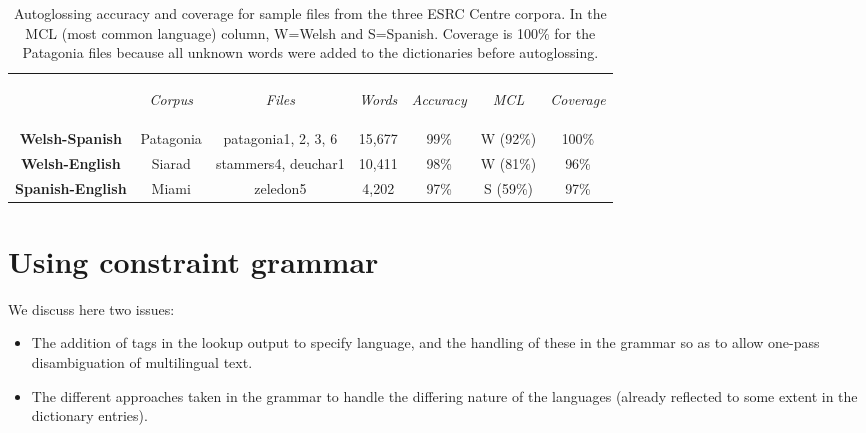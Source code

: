 \documentclass[11pt]{article}
\begin{document}
\begin{table*}[!hbtp]
\centering
\begin{tabular}{ccccccc}
& \begin{small}\textit{Corpus}\end{small} & \begin{small}\textit{Files}\end{small} & \begin{small}\textit{Words}\end{small} & \begin{small}\textit{Accuracy}\end{small} & \begin{small}\textit{MCL}\end{small} & \begin{small}\textit{Coverage}\end{small} \\
\cline{2-7}\noalign{\smallskip}
\textbf{Welsh-Spanish} & Patagonia & patagonia1, 2, 3, 6 & 15,677 & 99\% & W (92\%) & 100\% \\
\textbf{Welsh-English} & Siarad & stammers4, deuchar1 & 10,411 & 98\% & W (81\%) & 96\% \\
\textbf{Spanish-English} & Miami & zeledon5 & 4,202 & 97\% & S (59\%) & 97\% \\
\end{tabular}
\caption[center]{Autoglossing accuracy and coverage for sample files from the three ESRC Centre corpora.  In the MCL (most common language) column, W=Welsh and S=Spanish.  Coverage is 100\% for the Patagonia files because all unknown words were added to the dictionaries before autoglossing.}
\label{accuracy}
\end{table*}


\section{Using constraint grammar}
\label{sec:constraint}


We discuss here two issues:
\begin{itemize}
\item The addition of tags in the lookup output to specify language, and the handling of these in the grammar so as to allow one-pass disambiguation of multilingual text.
\item The different approaches taken in the grammar to handle the differing nature of the languages (already reflected to some extent in the dictionary entries).
\end{itemize}
\end{document}
